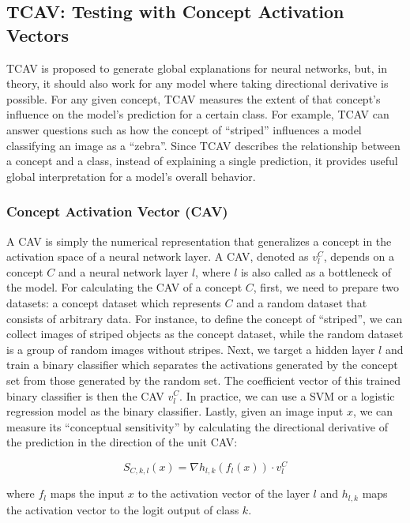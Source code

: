 \documentclass[12pt,]{krantz}
\begin{document}
\subsection{TCAV: Testing with Concept Activation
Vectors}\label{tcav-testing-with-concept-activation-vectors}

TCAV is proposed to generate global explanations for neural networks,
but, in theory, it should also work for any model where taking
directional derivative is possible. For any given concept, TCAV measures
the extent of that concept's influence on the model's prediction for a
certain class. For example, TCAV can answer questions such as how the
concept of ``striped'' influences a model classifying an image as a
``zebra''. Since TCAV describes the relationship between a concept and a
class, instead of explaining a single prediction, it provides useful
global interpretation for a model's overall behavior.

\subsubsection{Concept Activation Vector
(CAV)}\label{concept-activation-vector-cav}

A CAV is simply the numerical representation that generalizes a concept
in the activation space of a neural network layer. A CAV, denoted as
\(v_l^C\), depends on a concept \(C\) and a neural network layer \(l\),
where \(l\) is also called as a bottleneck of the model. For calculating
the CAV of a concept \(C\), first, we need to prepare two datasets: a
concept dataset which represents \(C\) and a random dataset that
consists of arbitrary data. For instance, to define the concept of
``striped'', we can collect images of striped objects as the concept
dataset, while the random dataset is a group of random images without
stripes. Next, we target a hidden layer \(l\) and train a binary
classifier which separates the activations generated by the concept set
from those generated by the random set. The coefficient vector of this
trained binary classifier is then the CAV \(v_l^C\). In practice, we can
use a SVM or a logistic regression model as the binary classifier.
Lastly, given an image input \(x\), we can measure its ``conceptual
sensitivity'' by calculating the directional derivative of the
prediction in the direction of the unit CAV:

\[S_{C,k,l}(x)=\nabla h_{l,k}(f_l(x))\cdot v_l^C\]

where \(f_l\) maps the input \(x\) to the activation vector of the layer
\(l\) and \(h_{l,k}\) maps the activation vector to the logit output of
class \(k\).
\end{document}
